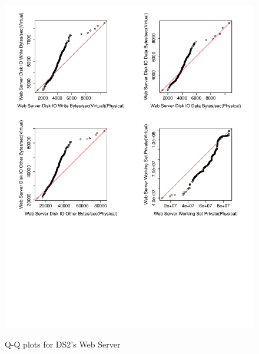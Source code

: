 \begin{figure}[tbh]
	\centering
	{\includegraphics[width=1.0\textwidth]{figures/appendix/qq_plots/DS2/Web_Server/Fourth_four.pdf}}
	\caption{Q-Q plots for DS2's Web Server}
\end{figure}

